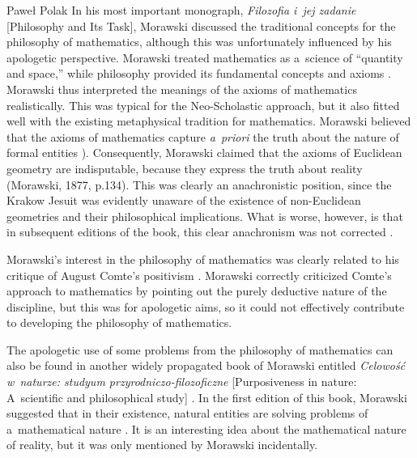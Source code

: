 \begin{artengenv}{Paweł Polak}
In his most important monograph, \textit{Filozofia i~jej zadanie} [Philosophy and Its Task], Morawski
\parencite*[][]{morawski_filozofia_1877} %
 discussed the traditional concepts for the philosophy of mathematics, although this was unfortunately influenced by his apologetic perspective. Morawski treated mathematics as a~science of ``quantity and space,'' while philosophy provided its fundamental concepts and axioms 
\parencite[][pp.22,~27,~273]{morawski_filozofia_1877}. %
 Morawski thus interpreted the meanings of the axioms of mathematics realistically. This was typical for the Neo-Scholastic approach, but it also fitted well with the existing metaphysical tradition for mathematics. Morawski believed that the axioms of mathematics capture \textit{a~priori} the truth about the nature of formal entities 
\parencite[][p.263 (footnote 1]{morawski_filozofia_1877}%
). Consequently, Morawski claimed that the axioms of Euclidean geometry are indisputable, because they express the truth about reality (Morawski, 1877, p.134). This was clearly an anachronistic position, since the Krakow Jesuit was evidently unaware of the existence of non-Euclidean geometries and their philosophical implications. What is worse, however, is that in subsequent editions of the book, this clear anachronism was not corrected 
\parencite[see for example the third edition][p.163]{morawski_filozofia_1899}.%


Morawski's interest in the philosophy of mathematics was clearly related to his critique of August Comte's positivism
\parencite[][pp.174–175]{morawski_filozofia_1877}. %
 Morawski correctly criticized Comte's approach to mathematics by pointing out the purely deductive nature of the discipline, but this was for apologetic aims, so it could not effectively contribute to developing the philosophy of mathematics.

The apologetic use of some problems from the philosophy of mathematics can also be found in another widely propagated book of Morawski entitled \textit{Celowość w~naturze: studyum przyrodniczo-filozoficzne} [Purposiveness in nature: A~scientific and philosophical study]
\parencite[][]{morawski_celowosc_1887}. %
 In the first edition of this book, Morawski suggested that in their existence, natural entities are solving problems of a~mathematical nature 
\parencite[][p.54]{morawski_celowosc_1887}. %
 It is an interesting idea about the mathematical nature of reality, but it was only mentioned by Morawski incidentally.


\end{artengenv}
